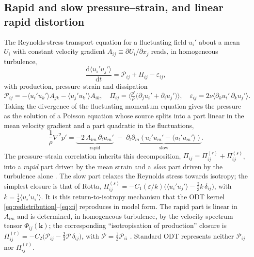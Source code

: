 \documentclass[lineno]{JFM-FLM_Au}
\begin{document}
\subsection{Rapid and slow pressure--strain, and linear rapid
distortion}\label{sec:rapid-slow}

The Reynolds-stress transport equation for a fluctuating field $u_i'$ about
a mean $U_i$ with constant velocity gradient $A_{ij}\equiv\partial
U_i/\partial x_j$ reads, in homogeneous turbulence,
\begin{equation}
  \frac{\mathrm{d}\langle u_i' u_j'\rangle}{\mathrm{d}t}
  = \mathcal{P}_{ij} + \Pi_{ij} - \varepsilon_{ij},
  \label{eq:rstransport}
\end{equation}
with production, pressure--strain and dissipation
\begin{equation}
  \mathcal{P}_{ij}=-\langle u_i' u_k'\rangle A_{jk}
                   -\langle u_j' u_k'\rangle A_{ik},
  \quad
  \Pi_{ij}=\Big\langle \tfrac{p'}{\rho}
            \big(\partial_j u_i'+\partial_i u_j'\big)\Big\rangle,
  \quad
  \varepsilon_{ij}=2\nu\langle \partial_k u_i'\,\partial_k u_j'\rangle .
  \label{eq:Pij}
\end{equation}
Taking the divergence of the fluctuating momentum equation gives the
pressure as the solution of a Poisson equation whose source splits into a
part linear in the mean velocity gradient and a part quadratic in the
fluctuations,
\begin{equation}
  \frac{1}{\rho}\nabla^2 p'
  = \underbrace{-2\,A_{lm}\,\partial_l u_m'}_{\text{rapid}}
    \;-\;
    \underbrace{\partial_l\partial_m\!\left(u_l' u_m'
     -\langle u_l' u_m'\rangle\right)}_{\text{slow}} .
  \label{eq:poisson}
\end{equation}
The pressure--strain correlation inherits this decomposition,
$\Pi_{ij}=\Pi_{ij}^{(r)}+\Pi_{ij}^{(s)}$, into a \emph{rapid} part driven
by the mean strain and a \emph{slow} part driven by the turbulence alone
\citep{Pope2000}. The slow part relaxes the Reynolds stress towards
isotropy; the simplest closure is that of Rotta,
$\Pi_{ij}^{(s)}=-C_1(\varepsilon/k)\big(\langle u_i'u_j'\rangle
-\tfrac{2}{3}k\,\delta_{ij}\big)$, with $k=\tfrac12\langle u_i'u_i'\rangle$.
It is this return-to-isotropy mechanism that the ODT kernel
\eqref{eq:redistribution}--\eqref{eq:ci} reproduces in model form. The
rapid part is linear in $A_{lm}$ and is determined, in homogeneous
turbulence, by the velocity-spectrum tensor
$\Phi_{ij}(\boldsymbol{k})$; the corresponding ``isotropisation of
production'' closure is
$\Pi_{ij}^{(r)}=-C_2\big(\mathcal{P}_{ij}-\tfrac{2}{3}\mathcal{P}\,
\delta_{ij}\big)$, with $\mathcal{P}=\tfrac12\mathcal{P}_{ii}$
\citep{Pope2000}. Standard ODT represents neither $\mathcal{P}_{ij}$ nor
$\Pi_{ij}^{(r)}$.
\end{document}
